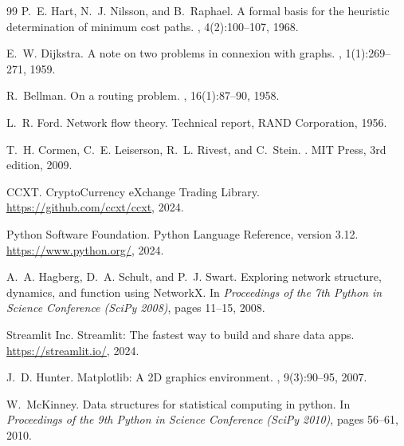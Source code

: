 \begin{thebibliography}{99}
P.~E. Hart, N.~J. Nilsson, and B.~Raphael.
\newblock A formal basis for the heuristic determination of minimum cost paths.
, 4(2):100--107, 1968.

E.~W. Dijkstra.
\newblock A note on two problems in connexion with graphs.
, 1(1):269--271, 1959.

R.~Bellman.
\newblock On a routing problem.
, 16(1):87--90, 1958.

L.~R. Ford.
\newblock Network flow theory.
\newblock Technical report, RAND Corporation, 1956.

T.~H. Cormen, C.~E. Leiserson, R.~L. Rivest, and C.~Stein.
.
\newblock MIT Press, 3rd edition, 2009.

CCXT.
\newblock CryptoCurrency eXchange Trading Library.
\newblock \url{https://github.com/ccxt/ccxt}, 2024.

Python Software Foundation.
\newblock Python Language Reference, version 3.12.
\newblock \url{https://www.python.org/}, 2024.

A.~A. Hagberg, D.~A. Schult, and P.~J. Swart.
\newblock Exploring network structure, dynamics, and function using NetworkX.
\newblock In {\em Proceedings of the 7th Python in Science Conference (SciPy 2008)}, pages 11--15, 2008.

Streamlit Inc.
\newblock Streamlit: The fastest way to build and share data apps.
\newblock \url{https://streamlit.io/}, 2024.

J.~D. Hunter.
\newblock Matplotlib: A 2D graphics environment.
, 9(3):90--95, 2007.

W.~McKinney.
\newblock Data structures for statistical computing in python.
\newblock In {\em Proceedings of the 9th Python in Science Conference (SciPy 2010)}, pages 56--61, 2010.

\end{thebibliography}

